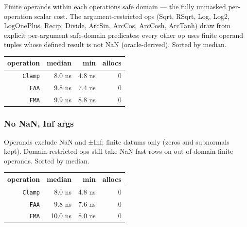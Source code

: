 \label{9973129846987395370}{}


Finite operands within each operation{\textquotesingle}s safe domain — the fully unmasked per-operation scalar cost. The argument-restricted ops (Sqrt, RSqrt, Log, Log2, LogOnePlus, Recip, Divide, ArcSin, ArcCos, ArcCosh, ArcTanh) draw from explicit per-argument safe-domain predicates; every other op uses finite operand tuples whose defined result is not NaN (oracle-derived). Sorted by median.




\begin{table}[h]
\centering
\begin{tabulary}{\linewidth}{R R R R}
\toprule
operation & median & min & allocs \\
\toprule
\texttt{Clamp} & 8.0 ns & 4.8 ns & 0 \\
\texttt{FAA} & 9.8 ns & 7.4 ns & 0 \\
\texttt{FMA} & 9.9 ns & 8.8 ns & 0 \\
\bottomrule
\end{tabulary}

\end{table}



\subsubsection{No NaN, Inf args}



\label{15876135725619624151}{}


Operands exclude NaN and ±Inf; finite datums only (zeros and subnormals kept). Domain-restricted ops still take NaN fast rows on out-of-domain finite operands. Sorted by median.




\begin{table}[h]
\centering
\begin{tabulary}{\linewidth}{R R R R}
\toprule
operation & median & min & allocs \\
\toprule
\texttt{Clamp} & 8.0 ns & 4.8 ns & 0 \\
\texttt{FAA} & 9.8 ns & 7.6 ns & 0 \\
\texttt{FMA} & 10.0 ns & 8.0 ns & 0 \\
\bottomrule
\end{tabulary}

\end{table}



